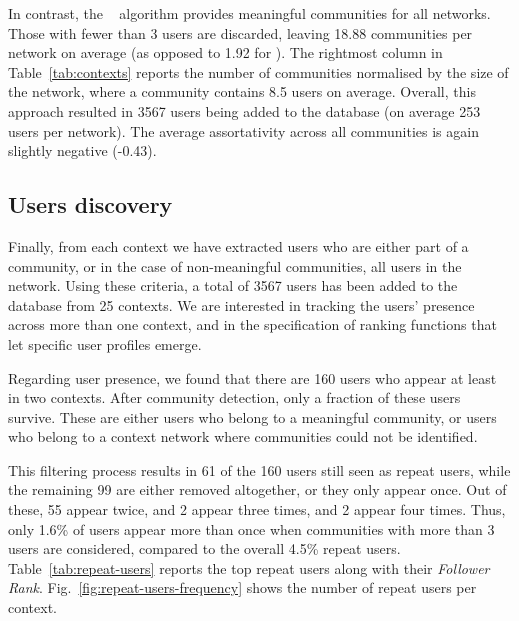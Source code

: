 \documentclass[runningheads]{llncs}
\begin{document}
In contrast, the \infomap~ algorithm provides meaningful communities for all networks.
Those with fewer than 3 users are discarded, leaving  18.88 communities per network on average (as opposed to 1.92 for \demon).
The rightmost column in Table~\ref{tab:contexts} reports the number of communities normalised by the size of the network, where a community contains 8.5 users on average. 
Overall, this approach resulted in 3567 users being added to the database (on average 253 users per network).
The average assortativity across all communities is again slightly negative (-0.43).





\subsection{Users discovery}  \label{sec:users}

Finally, from each context we have extracted users who are either part of a community, or in the case of non-meaningful communities, all users in the network.
Using these criteria, a total of 3567 users has been added to the database from 25 contexts.
We are interested in tracking the users' presence across more than one context, and in the specification of ranking functions that let specific user profiles emerge.

Regarding user presence, we found that there are 160 users who appear at least in two contexts. 
After community detection, only a fraction of these users survive. 
These are either users who belong to a meaningful community, or users who belong to a context network where communities could not be identified.

This filtering process results in 61 of the 160 users still seen as repeat users, while the remaining 99 are either removed altogether, or they only appear once. 
Out of these, 55 appear twice, and 2 appear three times, and 2 appear four times. 
Thus, only 1.6\% of users appear more than once when communities with more than 3 users are considered, compared to the overall 4.5\% repeat users.
%
Table~\ref{tab:repeat-users} reports the top repeat users along with their \textit{Follower Rank}.  
%
Fig.~\ref{fig:repeat-users-frequency} shows the number of repeat users per context. 
\end{document}
